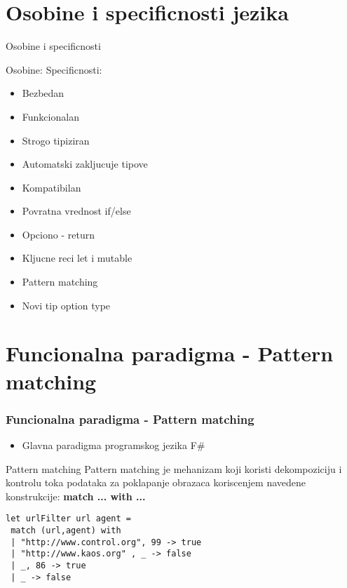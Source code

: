 \documentclass{beamer}
\begin{document}
\section{Osobine i specificnosti jezika}
\begin{frame}{Osobine i specificnosti}
\begin{center}
Osobine:						Specificnosti:
\begin{multicols}{2}
\begin{itemize}
  \item Bezbedan
  \item Funkcionalan
  \item Strogo tipiziran
  \item Automatski zakljucuje tipove
  \item Kompatibilan
  \item Povratna vrednost if/else
  \item Opciono - return
  \item Kljucne reci let i mutable
  \item Pattern matching
  \item Novi tip option type
\end{itemize}
\end{multicols}
\end{center}
\end{frame}

\section{Funcionalna paradigma - Pattern matching}  
\begin{frame}[fragile]
\frametitle{Funcionalna paradigma - Pattern matching}

\begin{itemize}
  \item Glavna paradigma programskog jezika F\#
\end{itemize}

\begin{block}{Pattern matching}
Pattern matching je mehanizam koji koristi dekompoziciju i kontrolu toka podataka za poklapanje obrazaca koriscenjem navedene konstrukcije:
\textbf{ match ... with ...}
\begin{lstlisting}
let urlFilter url agent =
 match (url,agent) with
 | "http://www.control.org", 99 -> true
 | "http://www.kaos.org" , _ -> false
 | _, 86 -> true
 | _ -> false
\end{lstlisting} 
\end{block}

\end{frame}
\end{document}
